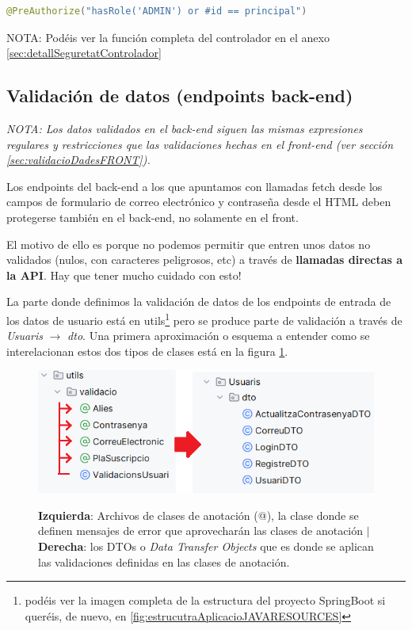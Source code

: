 \documentclass[a4paper,12pt]{report}
\begin{document}
\begin{lstlisting}[language=java, basicstyle=\ttfamily\footnotesize, keywordstyle=\color{magenta}]
	@PreAuthorize("hasRole('ADMIN') or #id == principal")
\end{lstlisting}

	NOTA: Podéis ver la función completa del controlador en el anexo \ref{sec:detallSeguretatControlador}
	
	
		
		

		
		
			\subsection{Validación de datos (endpoints back-end)}
			\label{sec:validacioDadesBACK}
			
			\textit{NOTA: Los datos validados en el back-end siguen las mismas expresiones regulares y restricciones que las validaciones hechas en el front-end (ver sección \ref{sec:validacioDadesFRONT}).}
			
			Los endpoints del back-end a los que apuntamos con llamadas fetch desde los campos de formulario de correo electrónico y contraseña desde el HTML deben protegerse también en el back-end, no solamente en el front.
			
			El motivo de ello es porque no podemos permitir que entren unos datos no validados (nulos, con caracteres peligrosos, etc) a través de \textbf{llamadas directas a la API}. Hay que tener mucho cuidado con esto! 
			
			La parte donde definimos la validación de datos de los endpoints de entrada de los datos de usuario está en utils\footnote{podéis ver la imagen completa de la estructura del proyecto SpringBoot si queréis, de nuevo, en \ref{fig:estrucutraAplicacioJAVARESOURCES}} pero se produce parte de validación a través de \textit{Usuaris} $\rightarrow$ \textit{dto}. Una primera aproximación o esquema a entender como se interelacionan estos dos tipos de clases está en la figura \ref{fig:validacioBackArxius}.
			
			
			
			\FloatBarrier
			\setlength{\belowcaptionskip}{3pt}
			\begin{figure}[H]
				\centering
				\caption{\textbf{Izquierda}: Archivos de clases de anotación (@), la clase donde se definen mensajes de error que aprovecharán las clases de anotación $|$  \textbf{Derecha}: los DTOs o \textit{Data Transfer Objects} que es donde se aplican las validaciones definidas en las clases de anotación.}
				\includegraphics[width=.8\linewidth]{img/validacioBackArxius.png}
				\label{fig:validacioBackArxius}
			\end{figure}
			\FloatBarrier
			
\end{document}
